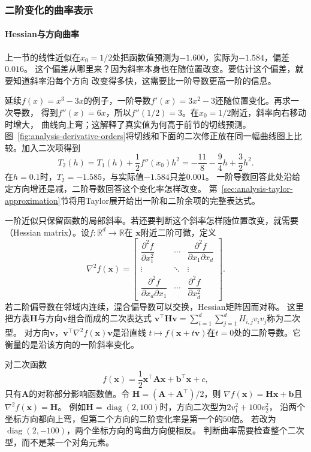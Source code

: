 \subsubsection{二阶变化的曲率表示}
\label{sec:analysis-second-order-curvature}

\paragraph{Hessian与方向曲率}

上一节的线性近似在$x_0=1/2$处把函数值预测为$-1.600$，实际为$-1.584$，偏差$0.016$。
这个偏差从哪里来？因为斜率本身也在随位置改变。要估计这个偏差，就要知道斜率沿每个方向
改变得多快，这需要比一阶导数更高一阶的信息。

延续$f(x)=x^3-3x$的例子，一阶导数$f'(x)=3x^2-3$还随位置变化。再求一次导数，
得到$f''(x)=6x$，所以$f''(1/2)=3$。在$x_0=1/2$附近，斜率向右移动时增大，
曲线向上弯；这解释了真实值为何高于前节的切线预测。图~\ref{fig:analysis-derivative-orders}将切线和下面的二次修正放在同一幅曲线图上比较。加入二次项得到
\begin{equation}
  T_2(h)=T_1(h)+\frac12f''(x_0)h^2
        =-\frac{11}{8}-\frac94h+\frac32h^2.
\label{eq:analysis-cubic-quadratic-model}
\end{equation}
在$h=0.1$时，$T_2=-1.585$，与实际值$-1.584$只差$0.001$。
一阶导数回答此处沿给定方向增还是减，二阶导数回答这个变化率怎样改变。
第~\ref{sec:analysis-taylor-approximation}节将用Taylor展开给出一阶和二阶余项的完整表达式。

一阶近似只保留函数的局部斜率。若还要判断这个斜率怎样随位置改变，就需要
（Hessian matrix）。设$f:\mathbb{R}^d\to\mathbb{R}$在 $\bm{x}$附近二阶可微，定义
\[   \nabla^2 f(\bm{x})   =
\begin{bmatrix}     \dfrac{\partial^2 f}{\partial x_1^2} &     \cdots &     \dfrac{\partial^2 f}{\partial x_1\partial x_d}\\     \vdots & \ddots & \vdots\\     \dfrac{\partial^2 f}{\partial x_d\partial x_1} &     \cdots &     \dfrac{\partial^2 f}{\partial x_d^2}
\end{bmatrix}. \]
若二阶偏导数在邻域内连续，混合偏导数可以交换，Hessian矩阵因而对称。
这里把方表$\bm H$与方向$\bm v$组合而成的二次表达式
$\bm v^\top\bm H\bm v=\sum_{i=1}^d\sum_{j=1}^d H_{i,j}v_i v_j$称为二次型。
对方向$\bm v$，$\bm{v}^{\top}\nabla^2f(\bm{x})\bm{v}$是沿直线
$t\mapsto f(\bm{x}+t\bm{v})$在$t=0$处的二阶导数。它衡量的是沿该方向的一阶斜率变化。

对二次函数
\[   f(\bm{x})   =   \frac12\bm{x}^{\top}\bm{A}\bm{x}   +\bm{b}^{\top}\bm{x}+c, \]
只有$\bm{A}$的对称部分影响函数值。令 $\bm{H}=(\bm{A}+\bm{A}^{\top})/2$，则 $\nabla f(\bm{x})=\bm{H}\bm{x}+\bm{b}$且 $\nabla^2f(\bm{x})=\bm{H}$。
例如$\bm H=\operatorname{diag}(2,100)$时，方向二次型为$2v_1^2+100v_2^2$，
沿两个坐标方向都向上弯，但第二个方向的二阶变化率是第一个的$50$倍。
若改为$\operatorname{diag}(2,-100)$，两个坐标方向的弯曲方向便相反。
判断曲率需要检查整个二次型，而不是某一个对角元素。

